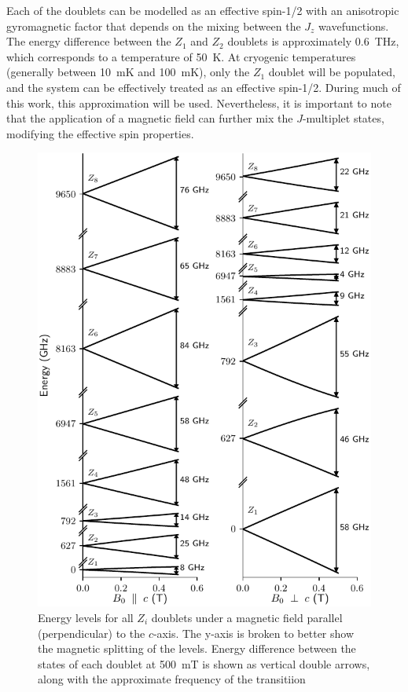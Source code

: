 Each of the doublets can be modelled as an effective spin-1/2 with an anisotropic gyromagnetic factor that depends on the mixing between the $J_z$ wavefunctions. The energy difference between the $Z_1$ and $Z_2$ doublets is approximately 0.6~THz, which corresponds to a temperature of 50~K. At cryogenic temperatures (generally between 10~mK and 100~mK), only the $Z_1$ doublet will be populated, and the system can be effectively treated as an effective spin-1/2. During much of this work, this approximation will be used. Nevertheless, it is important to note that the application of a magnetic field can further mix the $J$-multiplet states, modifying the effective spin properties.

\begin{figure}
    \includegraphics{chapter2/figures/energy_levels_vs_Bz_all.pdf}
    \caption[Crystal field levels]{Energy levels for all $Z_i$ doublets under a magnetic field parallel (perpendicular) to the $c$-axis. The y-axis is broken to better show the magnetic splitting of the levels. Energy difference between the states of each doublet at 500~mT is shown as vertical double arrows, along with the approximate frequency of the transitiion}
\end{figure}


